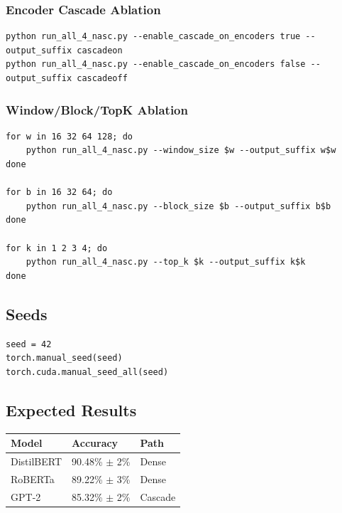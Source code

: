\subsubsection{Encoder Cascade Ablation}

\begin{lstlisting}
python run_all_4_nasc.py --enable_cascade_on_encoders true --output_suffix cascadeon
python run_all_4_nasc.py --enable_cascade_on_encoders false --output_suffix cascadeoff
\end{lstlisting}

\subsubsection{Window/Block/TopK Ablation}

\begin{lstlisting}
for w in 16 32 64 128; do
    python run_all_4_nasc.py --window_size $w --output_suffix w$w
done

for b in 16 32 64; do
    python run_all_4_nasc.py --block_size $b --output_suffix b$b
done

for k in 1 2 3 4; do
    python run_all_4_nasc.py --top_k $k --output_suffix k$k
done
\end{lstlisting}

\subsection{Seeds}

\begin{lstlisting}
seed = 42
torch.manual_seed(seed)
torch.cuda.manual_seed_all(seed)
\end{lstlisting}

\subsection{Expected Results}

\begin{table}[H]
\centering
\small
\begin{tabular}{lll}
\toprule
\textbf{Model} & \textbf{Accuracy} & \textbf{Path} \\
\midrule
DistilBERT & 90.48\% $\pm$ 2\% & Dense \\
RoBERTa & 89.22\% $\pm$ 3\% & Dense \\
GPT-2 & 85.32\% $\pm$ 2\% & Cascade \\
\bottomrule
\end{tabular}
\end{table}


